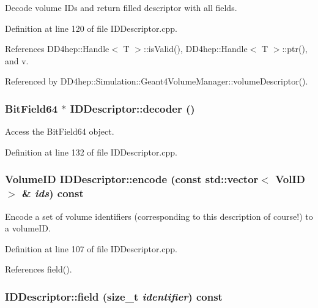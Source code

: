 Decode volume IDs and return filled descriptor with all fields. 

Definition at line 120 of file IDDescriptor.cpp.

References DD4hep::Handle$<$ T $>$::isValid(), DD4hep::Handle$<$ T $>$::ptr(), and v.

Referenced by DD4hep::Simulation::Geant4VolumeManager::volumeDescriptor().\hypertarget{class_d_d4hep_1_1_geometry_1_1_i_d_descriptor_ac62f98d6db97a51cadb2f17c58369d18}{
\subsubsection[{decoder}]{\setlength{\rightskip}{0pt plus 5cm}BitField64 $\ast$ IDDescriptor::decoder ()}}
\label{class_d_d4hep_1_1_geometry_1_1_i_d_descriptor_ac62f98d6db97a51cadb2f17c58369d18}


Access the BitField64 object. 

Definition at line 132 of file IDDescriptor.cpp.\hypertarget{class_d_d4hep_1_1_geometry_1_1_i_d_descriptor_a87bd7f294359971dfdcad72c414597ed}{
\subsubsection[{encode}]{\setlength{\rightskip}{0pt plus 5cm}VolumeID IDDescriptor::encode (const std::vector$<$ {\bf VolID} $>$ \& {\em ids}) const}}
\label{class_d_d4hep_1_1_geometry_1_1_i_d_descriptor_a87bd7f294359971dfdcad72c414597ed}


Encode a set of volume identifiers (corresponding to this description of course!) to a volumeID. 

Definition at line 107 of file IDDescriptor.cpp.

References field().\hypertarget{class_d_d4hep_1_1_geometry_1_1_i_d_descriptor_a929d0beaa15914894c8c77f1c4af291a}{
\subsubsection[{field}]{ IDDescriptor::field (size\_\-t {\em identifier}) const}}
\label{class_d_d4hep_1_1_geometry_1_1_i_d_descriptor_a929d0beaa15914894c8c77f1c4af291a}


